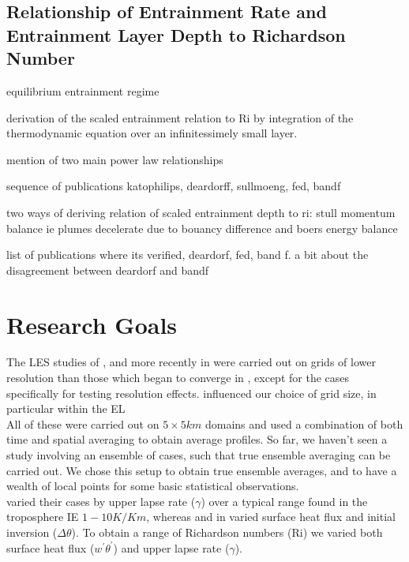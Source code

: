 \subsection{Relationship of Entrainment Rate and Entrainment Layer Depth to Richardson Number}

equilibrium entrainment regime

derivation of the scaled entrainment relation to Ri by integration of the thermodynamic equation over an infinitessimely small layer.

mention of two main power law relationships

sequence of publications katophilips, deardorff, sullmoeng, fed, bandf

two ways of deriving relation of scaled entrainment depth to ri: stull momentum balance ie plumes decelerate due to bouancy difference
and boers energy balance

list of publications where its verified, deardorf, fed, band f.  a bit about the disagreement between deardorf and bandf

\section{Research Goals}
\label{sec:ResearchGoals}

The LES studies of \citeauthor{SullMoengStev} \cite{SullMoengStev}, \citeauthor{FedConzMir04} \cite{FedConzMir04} and more recently \citeauthor{BrooksFowler2} in \cite{BrooksFowler2} were carried out on grids of lower resolution than those which began to converge in \citeauthor{SullPat} \cite{SullPat}, except for the cases specifically for testing resolution effects. \citeauthor{SullPat} \cite{SullPat} influenced our choice of grid size, in particular within the \acs{EL}\\

 All of these were carried out on $5 \times 5 km$ domains and used a combination of both time and spatial averaging to obtain average profiles.  So far, we haven't seen a study involving an ensemble of cases, such that true ensemble averaging can be carried out.  We chose this setup to obtain true ensemble averages, and to have a wealth of local points for some basic statistical observations.\\

\citeauthor{FedConzMir04} \cite{FedConzMir04} varied their cases by upper lapse rate ($\gamma$) over a typical range found in the troposphere IE $1 - 10 K / Km$, whereas \citeauthor{SullMoengStev} \cite{SullMoengStev} and \citeauthor{BrooksFowler2} in \cite{BrooksFowler2} varied surface heat flux and initial inversion ($\Delta \theta$).  To obtain a range of Richardson numbers (\acs{Ri}) we varied both surface heat flux ($w^{'}\theta^{'}$) and upper lapse rate ($\gamma$).\\


